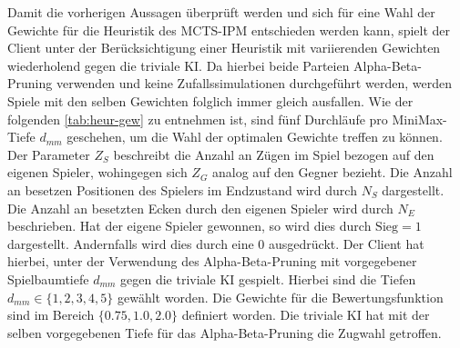 \documentclass[12pt,a4paper,bibliography=totocnumbered,listof=totocnumbered]{article}
\begin{document}
Damit die vorherigen Aussagen überprüft werden und sich für eine Wahl der Gewichte für die Heuristik des MCTS-IPM entschieden werden kann, spielt der Client unter der Berücksichtigung einer Heuristik mit variierenden Gewichten wiederholend gegen die triviale KI. Da hierbei beide Parteien Alpha-Beta-Pruning verwenden und keine Zufallssimulationen durchgeführt werden, werden Spiele mit den selben Gewichten folglich immer gleich ausfallen. Wie der folgenden \autoref{tab:heur-gew} zu entnehmen ist, sind fünf Durchläufe pro MiniMax-Tiefe $d_{mm}$ geschehen, um die Wahl der optimalen Gewichte treffen zu können. Der Parameter $Z_{S}$ beschreibt die Anzahl an Zügen im Spiel bezogen auf den eigenen Spieler, wohingegen sich $Z_{G}$ analog auf den Gegner bezieht. Die Anzahl an besetzen Positionen des Spielers im Endzustand wird durch $N_{S}$ dargestellt. Die Anzahl an besetzten Ecken durch den eigenen Spieler wird durch $N_E$ beschrieben. Hat der eigene Spieler gewonnen, so wird dies durch $\text{Sieg}=1$ dargestellt. Andernfalls wird dies durch eine 0 ausgedrückt. Der Client hat hierbei, unter der Verwendung des Alpha-Beta-Pruning mit vorgegebener Spielbaumtiefe $d_{mm}$ gegen die triviale KI gespielt. Hierbei sind die Tiefen $d_{mm} \in \{1, 2, 3, 4, 5\}$ gewählt worden. Die Gewichte für die Bewertungsfunktion sind im Bereich $\{0.75, 1.0, 2.0\}$ definiert worden. Die triviale KI hat mit der selben vorgegebenen Tiefe für das Alpha-Beta-Pruning die Zugwahl getroffen.
\end{document}

